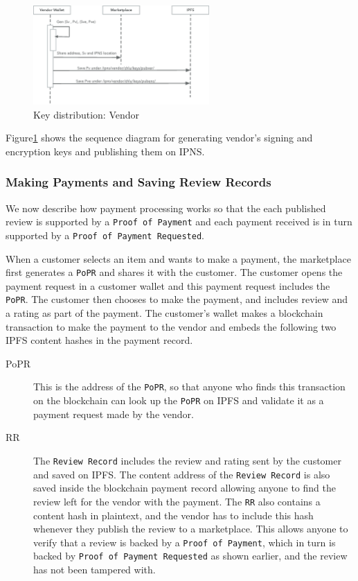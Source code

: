 \documentclass[a4paper]{article}
\begin{document}
\begin{figure}
\centering
\includegraphics[width=0.6\textwidth]{../vendor-wallet-init.eps}
\caption{\label{fig:vendor-wallet-init}Key distribution: Vendor}
\end{figure}

Figure\ref{fig:vendor-wallet-init} shows the sequence diagram for
generating vendor's signing and encryption keys and publishing them on
IPNS\@.

\subsubsection{Making Payments and Saving Review Records}

We now describe how payment processing works so that the each
published review is supported by a \texttt{Proof of Payment} and each
payment received is in turn supported by a \texttt{Proof of Payment
  Requested}.

When a customer selects an item and wants to make a payment, the
marketplace first generates a \texttt{PoPR} and shares it with the
customer. The customer opens the payment request in a customer wallet
and this payment request includes the \texttt{PoPR}. The customer then
chooses to make the payment, and includes review and a rating as part
of the payment. The customer's wallet makes a blockchain transaction
to make the payment to the vendor and embeds the following two IPFS
content hashes in the payment record.

\begin{description}
\item[PoPR] This is the address of the \texttt{PoPR}, so that anyone who finds
  this transaction on the blockchain can look up the \texttt{PoPR} on
  IPFS and validate it as a payment request made by the vendor.
\item[RR] The \texttt{Review Record} includes the review and rating
  sent by the customer and saved on IPFS. The content address of the
  \texttt{Review Record} is also saved inside the blockchain payment
  record allowing anyone to find the review left for the vendor with
  the payment. The \texttt{RR} also contains a content hash in
  plaintext, and the vendor has to include this hash whenever they
  publish the review to a marketplace. This allows anyone to verify
  that a review is backed by a \texttt{Proof of Payment}, which in
  turn is backed by \texttt{Proof of Payment Requested} as shown
  earlier, and the review has not been tampered with.
\end{description}
\end{document}
